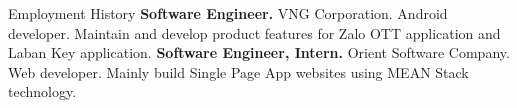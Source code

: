 \begin{rubric}{Employment History}
\entry*[03/2016 --  03/2017]%
	\textbf{Software Engineer.} VNG Corporation. Android developer. Maintain and develop product features for Zalo OTT application and Laban Key application.
%
%
\entry*[05/2015 -- 07/2015]%
	\textbf{Software Engineer, Intern.} Orient Software Company. Web developer. Mainly build Single Page App websites using MEAN Stack technology. 
%
\end{rubric}
